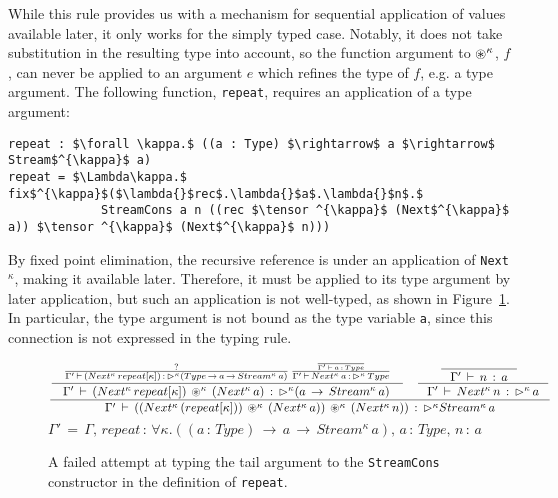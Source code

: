 

While this rule provides us with a mechanism for sequential application of
values available later, it only works for the simply typed case. Notably, it
does not take substitution in the resulting type into account, so the function
argument to $\circledast^\kappa$, $f$, can never be applied to an argument $e$ which
refines the type of $f$, e.g. a type argument. The following function,
\texttt{repeat}, requires an application of a type argument:

\begin{lstlisting}[mathescape,title=\ttBlock]
repeat : $\forall \kappa.$ ((a : Type) $\rightarrow$ a $\rightarrow$ Stream$^{\kappa}$ a)
repeat = $\Lambda\kappa.$ fix$^{\kappa}$($\lambda{}$rec$.\lambda{}$a$.\lambda{}$n$.$ 
             StreamCons a n ((rec $\tensor ^{\kappa}$ (Next$^{\kappa}$ a)) $\tensor ^{\kappa}$ (Next$^{\kappa}$ n)))
\end{lstlisting}

By fixed point elimination, the recursive reference is under an application
of \texttt{Next$^\kappa$}, making it available later. Therefore, it must be
applied to its type argument by later application, but such an application
is not well-typed, as shown in Figure~\ref{fig:repeat_failed_typing}. In
particular, the type argument is not bound as the type variable \texttt{a},
since this connection is not expressed in the typing rule.

\begin{figure}[h]
\centering
\[
\frac { \begin{matrix} \inference { \frac { ? }{ \Gamma '\, \vdash \, (Next^{\kappa}\,repeat[\kappa])\, :\, \later
        ^{\kappa}(Type\, \rightarrow \, a\, \rightarrow \, Stream^{\kappa}\, a) } \, 
      \frac {
        \frac {  }{ \Gamma '\, \vdash \, a\, :\, Type } 
      }
      { \Gamma '\, \vdash \,
        Next^{\kappa}\, a\, :\, \later ^{\kappa}\, Type }
    }{ \, \Gamma '\, \vdash \, (Next^{\kappa}\,repeat[\kappa])\,
      \tensor ^{\kappa} \, (Next^{\kappa}\, a)\, :\, \later ^{\kappa}(a\, \rightarrow \, Stream^{\kappa}\,
      a)\ }  & \inference { \inference {  }{ \Gamma '\, \vdash \, n\, :\, a }  }{
      \Gamma '\, \vdash \, Next^{\kappa}\, n\, :\, \later ^{\kappa} \, a }  \end{matrix} }{
  \Gamma '\, \vdash \, ((Next^{\kappa}\,(repeat[\kappa]))\, \tensor ^{\kappa} \, (Next^{\kappa}\, a))\, \tensor ^{\kappa} \,
  (Next^{\kappa}\, n))\, :\, \later ^{\kappa} Stream^{\kappa}\, a }
\]
\[
\Gamma '\, =\, \Gamma ,\, repeat\, :\, \forall\kappa.((a\, :\, Type)\, \rightarrow \,
a\, \rightarrow \, Stream^{\kappa}\, a),\, a\, :\, Type,\, n\, :\, a
\]
  \caption{A failed attempt at typing the tail argument to the
    \texttt{StreamCons} constructor in the definition of \texttt{repeat}.}
  \label{fig:repeat_failed_typing}
\end{figure}

